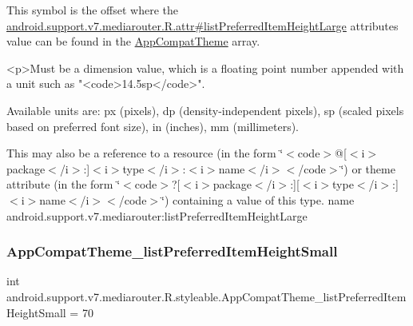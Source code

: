 This symbol is the offset where the \hyperlink{classandroid_1_1support_1_1v7_1_1mediarouter_1_1R_1_1attr_a339cb47f5138891279e93ced966d6637}{android.\+support.\+v7.\+mediarouter.\+R.\+attr\#list\+Preferred\+Item\+Height\+Large} attribute\textquotesingle{}s value can be found in the \hyperlink{classandroid_1_1support_1_1v7_1_1mediarouter_1_1R_1_1styleable_a4e3d3900c75d49aeb2f283cac00214d6}{App\+Compat\+Theme} array.

\begin{DoxyVerb}      <p>Must be a dimension value, which is a floating point number appended with a unit such as "<code>14.5sp</code>".
\end{DoxyVerb}
 Available units are\+: px (pixels), dp (density-\/independent pixels), sp (scaled pixels based on preferred font size), in (inches), mm (millimeters). 

This may also be a reference to a resource (in the form \char`\"{}$<$code$>$@\mbox{[}$<$i$>$package$<$/i$>$\+:\mbox{]}$<$i$>$type$<$/i$>$\+:$<$i$>$name$<$/i$>$$<$/code$>$\char`\"{}) or theme attribute (in the form \char`\"{}$<$code$>$?\mbox{[}$<$i$>$package$<$/i$>$\+:\mbox{]}\mbox{[}$<$i$>$type$<$/i$>$\+:\mbox{]}$<$i$>$name$<$/i$>$$<$/code$>$\char`\"{}) containing a value of this type.  name android.\+support.\+v7.\+mediarouter\+:list\+Preferred\+Item\+Height\+Large \mbox{\label{classandroid_1_1support_1_1v7_1_1mediarouter_1_1R_1_1styleable_af77cd07fa887ba15990b370f984b0d68}} 
\subsubsection{\texorpdfstring{App\+Compat\+Theme\+\_\+list\+Preferred\+Item\+Height\+Small}{AppCompatTheme\_listPreferredItemHeightSmall}}
{\footnotesize\ttfamily int android.\+support.\+v7.\+mediarouter.\+R.\+styleable.\+App\+Compat\+Theme\+\_\+list\+Preferred\+Item\+Height\+Small = 70\hspace{0.3cm}{\ttfamily [static]}}

